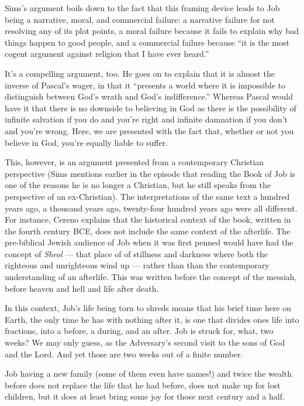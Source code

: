 Sims's argument boils down to the fact that this framing device leads to Job being a narrative, moral, and commercial failure: a narrative failure for not resolving any of its plot points, a moral failure because it fails to explain why bad things happen to good people, and a commercial failure because ``it is the most cogent argument against religion that I have ever heard.''

It's a compelling argument, too. He goes on to explain that it is almost the inverse of Pascal's wager, in that it ``presents a world where it is impossible to distinguish between God's wrath and God's indifference.'' Whereas Pascal would have it that there is no downside to believing in God as there is the possibility of infinite salvation if you do and you're right and infinite damnation if you don't and you're wrong. Here, we are presented with the fact that, whether or not you believe in God, you're equally liable to suffer.

This, however, is an argument presented from a contemporary Christian perspective (Sims mentions earlier in the episode that reading the Book of Job is one of the reasons he is no longer a Christian, but he still speaks from the perspective of an ex-Christian). The interpretations of the same text a hundred years ago, a thousand years ago, twenty-four hundred years ago were all different. For instance, Cereno explains that the historical context of the book, written in the fourth century BCE, does not include the same context of the afterlife. The pre-biblical Jewish audience of Job when it was first penned would have had the concept of \emph{Sheol} --- that place of of stillness and darkness where both the righteous and unrighteous wind up --- rather than than the contemporary understanding of an afterlife. This was written before the concept of the messiah, before heaven and hell and life after death.

In this context, Job's life being torn to shreds means that his brief time here on Earth, the only time he has with nothing after it, is one that divides ones life into fractions, into a before, a during, and an after. Job is struck for, what, two weeks? We may only guess, as the Adversary's second visit to the sons of God and the Lord. And yet those are two weeks out of a finite number.

Job having a new family (some of them even have names!) and twice the wealth before does not replace the life that he had before, does not make up for lost children, but it does at least bring some joy for those next century and a half.

